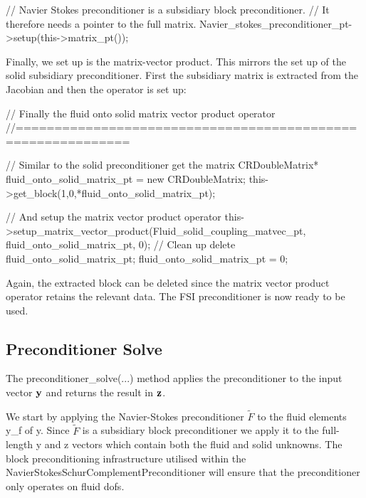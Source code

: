 \begin{DoxyEnumerate}
\begin{DoxyCodeInclude}
 \textcolor{comment}{// Navier Stokes preconditioner is a subsidiary block preconditioner.}
 \textcolor{comment}{// It therefore needs a pointer to the full matrix.}
 Navier\_stokes\_preconditioner\_pt->setup(this->matrix\_pt());

\end{DoxyCodeInclude}

\end{DoxyEnumerate}

Finally, we set up is the matrix-\/vector product. This mirrors the set up of the solid subsidiary preconditioner. First the subsidiary matrix is extracted from the Jacobian and then the operator is set up\+:

 
\begin{DoxyCodeInclude}
 \textcolor{comment}{// Finally the fluid onto solid matrix vector product operator}
 \textcolor{comment}{//============================================================}
 
 \textcolor{comment}{// Similar to the solid preconditioner get the matrix}
 CRDoubleMatrix* fluid\_onto\_solid\_matrix\_pt = \textcolor{keyword}{new} CRDoubleMatrix;
 this->get\_block(1,0,*fluid\_onto\_solid\_matrix\_pt);
 
 \textcolor{comment}{// And setup the matrix vector product operator}
 this->setup\_matrix\_vector\_product(Fluid\_solid\_coupling\_matvec\_pt,
                                   fluid\_onto\_solid\_matrix\_pt,
                                   0);
 \textcolor{comment}{// Clean up}
 \textcolor{keyword}{delete} fluid\_onto\_solid\_matrix\_pt; fluid\_onto\_solid\_matrix\_pt = 0;

\end{DoxyCodeInclude}


Again, the extracted block can be deleted since the matrix vector product operator retains the relevant data. The F\+SI preconditioner is now ready to be used.\hypertarget{index_solve}{}\subsection{Preconditioner Solve}\label{index_solve}
The {\ttfamily preconditioner\+\_\+solve}(...) method applies the preconditioner to the input vector $\bf y$ and returns the result in $\bf z$.

We start by applying the Navier-\/\+Stokes preconditioner $\tilde F$ to the fluid elements {\ttfamily y\+\_\+f} of {\ttfamily y}. Since $\tilde F$ is a subsidiary block preconditioner we apply it to the full-\/length {\ttfamily y} and {\ttfamily z} vectors which contain both the fluid and solid unknowns. The block preconditioning infrastructure utilised within the {\ttfamily Navier\+Stokes\+Schur\+Complement\+Preconditioner} will ensure that the preconditioner only operates on fluid dofs.

